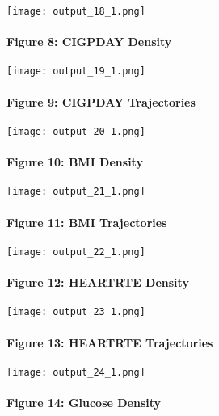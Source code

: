 \documentclass[11pt]{article}
\makeatletter
\def\maxwidth{\ifdim\Gin@nat@width>\linewidth\linewidth
    \else\Gin@nat@width\fi}
\let\Oldincludegraphics\includegraphics
\renewcommand{\includegraphics}[1]{\Oldincludegraphics[width=.8\maxwidth]{#1}}
\makeatother
\begin{document}
    \texttt{[image: output\_18\_1.png]}

    \hypertarget{figure-8-cigpday-density}{%
\paragraph{Figure 8: CIGPDAY Density}\label{figure-8-cigpday-density}}

    \texttt{[image: output\_19\_1.png]}

    \hypertarget{figure-9-cigpday-trajectories}{%
\paragraph{Figure 9: CIGPDAY
Trajectories}\label{figure-9-cigpday-trajectories}}

    \texttt{[image: output\_20\_1.png]}

    \hypertarget{figure-10-bmi-density}{%
\paragraph{Figure 10: BMI Density}\label{figure-10-bmi-density}}

    \texttt{[image: output\_21\_1.png]}

    \hypertarget{figure-11-bmi-trajectories}{%
\paragraph{Figure 11: BMI
Trajectories}\label{figure-11-bmi-trajectories}}

    \texttt{[image: output\_22\_1.png]}

    \hypertarget{figure-12-heartrte-density}{%
\paragraph{Figure 12: HEARTRTE
Density}\label{figure-12-heartrte-density}}

    \texttt{[image: output\_23\_1.png]}

    \hypertarget{figure-13-heartrte-trajectories}{%
\paragraph{Figure 13: HEARTRTE
Trajectories}\label{figure-13-heartrte-trajectories}}

    \texttt{[image: output\_24\_1.png]}

    \hypertarget{figure-14-glucose-density}{%
\paragraph{Figure 14: Glucose Density}\label{figure-14-glucose-density}}
\end{document}
